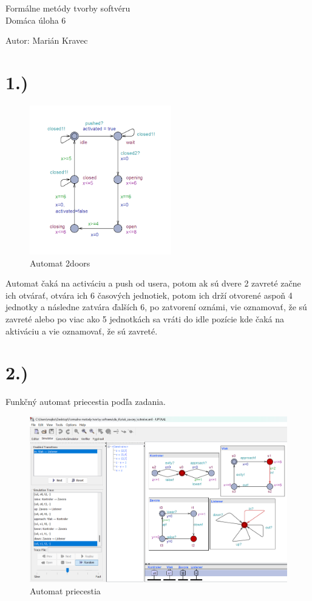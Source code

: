 \documentclass[a4paper]{article}
\begin{document}
 
	
\pagestyle{plain}

\begin{center}
	\sc\large
	Formálne metódy tvorby softvéru\\
	Domáca úloha 6
\end{center}

Autor: Marián Kravec

\section{1.)}

\begin{figure}[!h]
	\centering
	\includegraphics[width=0.55\textwidth]{doors.png}
	\caption{Automat 2doors}
\end{figure}

Automat čaká na activáciu a push od usera, potom ak sú dvere 2 zavreté začne ich otvárať, otvára ich 6 časových jednotiek, potom ich drží otvorené aspoň 4 jednotky a následne zatvára ďalších 6, po zatvorení oznámi, vie oznamovať, že sú zavreté alebo po viac ako 5 jednotkách sa vráti do idle pozície kde čaká na aktiváciu a vie oznamovať, že sú zavreté.

\section{2.)}

Funkčný automat priecestia podľa zadania.

\begin{figure}[!h]
	\centering
	\includegraphics[width=1.1\textwidth]{priecestie.png}
	\caption{Automat priecestia}
\end{figure}
\end{document}
